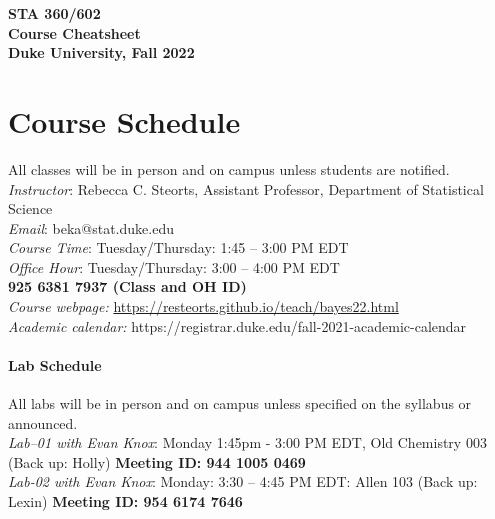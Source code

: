 \documentclass[11pt]{article}
\date{}
\begin{document}
\begin{center}
{\Large\bf STA 360/602\\ Course Cheatsheet} \\

{\Large\bf Duke University, Fall 2022} \\
\end{center}


\section{Course Schedule}
All classes will be in person and on campus unless students are notified. 
\emph{Instructor}: Rebecca C. Steorts,  Assistant Professor,  Department of Statistical Science\\
\emph{Email}: beka@stat.duke.edu\\
\emph{Course Time}: Tuesday/Thursday: 1:45 -- 3:00 PM EDT \\
\emph{Office Hour}: Tuesday/Thursday: 3:00 -- 4:00 PM EDT \\
\textbf{925 6381 7937 (Class and OH ID)}\\
\emph{Course webpage:} \url{https://resteorts.github.io/teach/bayes22.html} \\
\emph{Academic calendar:} https://registrar.duke.edu/fall-2021-academic-calendar


\paragraph{Lab Schedule}
All labs will be in person and on campus unless specified on the syllabus or announced. \\
\emph{Lab--01 with Evan Knox}: Monday 1:45pm - 3:00 PM EDT, Old Chemistry 003 (Back up: Holly) 
\textbf{Meeting ID: 944 1005 0469} \\
\vspace*{1em}
\emph{Lab-02 with Evan Knox}: Monday: 3:30 -- 4:45 PM EDT: Allen 103 (Back up: Lexin) \textbf{Meeting ID: 954 6174 7646}\\
\end{document}
